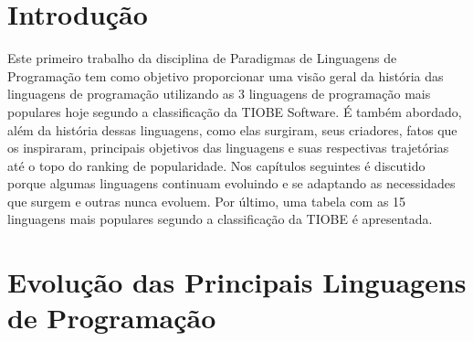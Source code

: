 \documentclass[
    12pt,               %
    openany,            %
    twoside,            %
    a4paper,            %
    brazil              %
    ]{abntex2}
\begin{document}
\frenchspacing 


\imprimircapa

\imprimirfolhaderosto*

\clearpage
{}
\tableofcontents*
\cleardoublepage



\textual

\chapter*[Introdução]{Introdução}

Este primeiro trabalho da disciplina de Paradigmas de Linguagens de Programação
tem como objetivo proporcionar uma visão geral da história das linguagens de
programação utilizando as 3 linguagens de programação mais populares hoje 
segundo a classificação da TIOBE Software. É também abordado, além da história dessas
linguagens, como elas surgiram, seus criadores, fatos que os inspiraram, principais
objetivos das linguagens e suas respectivas trajetórias até o topo do ranking de
popularidade.
Nos capítulos seguintes é discutido porque algumas linguagens continuam
evoluindo e se adaptando as necessidades que surgem e outras nunca evoluem.
Por último, uma tabela com as 15 linguagens mais populares segundo a
classificação da TIOBE é apresentada.

\chapter{Evolução das Principais Linguagens de Programação}
\end{document}
